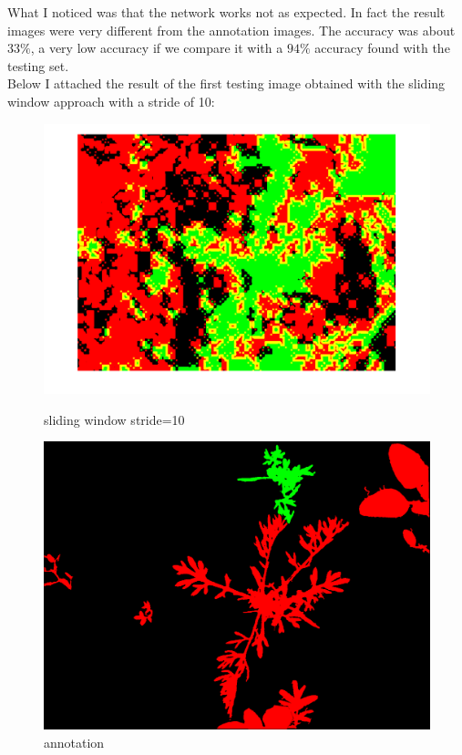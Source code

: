 \documentclass[]{report}
\begin{document}
What I noticed was that the network works not as expected. In fact the result images were very different from the annotation images. The accuracy was about $ 33\% $, a very low accuracy if we compare it with a $ 94\% $ accuracy found with the testing set.\\
Below I attached the result of the first testing image obtained with the sliding window approach with a stride of 10:

\begin{figure}[!htb]
  \includegraphics[width=\linewidth]{stride10im1.png}
  \caption{sliding window stride=10}\label{fig: sliding window problem}
\endminipage\hfill
{}
  \includegraphics[width=\linewidth]{annotation.png}
  \caption{annotation}\label{fig:annotation}
\endminipage\hfill
\end{figure}
\newpage
\end{document}

